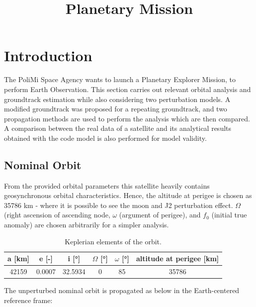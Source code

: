 \documentclass{article}
\title{Planetary Mission}
\begin{document}
	
	
\section{Introduction}
The  PoliMi  Space  Agency  wants  to  launch  a  Planetary  Explorer  Mission,  to  perform  Earth Observation. This section carries out relevant orbital analysis and groundtrack estimation while also considering two perturbation models. A modified groundtrack was proposed for a repeating groundtrack, and two propagation methods are used to perform the analysis which are then compared. A comparison between the real data of a satellite and its analytical results obtained with the code model is also performed for model validity. 

\subsection{Nominal Orbit}

From the provided orbital parameters this satellite heavily contains geosynchronous orbital characteristics. Hence, the altitude at perigee is chosen as 35786 km - where it is possible to see the moon and J2 perturbation effect. $\Omega$ (right ascension of ascending node, $\omega$ (argument of perigee), and $f_0$ (initial true anomaly) are chosen arbitrarily for a simpler analysis.


\begin{table}[ht]
	\centering
	\label{tab:keplerian_elements}
	\begin{tabular}{|c|c|c|c|c|c|}
		\hline
		a [km] & e [-] & i [°] & $\Omega$ [°] & $\omega$ [°] & altitude at perigee [km] \\
		\hline
		42159 & 0.0007 & 32.5934 & 0 & 85 & 35786 \\
		\hline
	\end{tabular}
	\caption{Keplerian elements of the orbit.}
	\label{tab:keplerian_elements}
\end{table}

The unperturbed nominal orbit is propagated as below in the Earth-centered reference frame:
\end{document}
